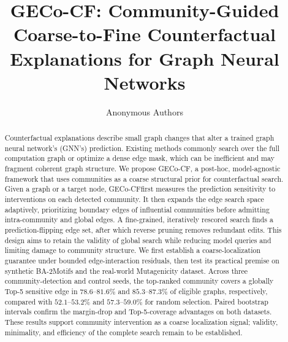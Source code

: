 \documentclass[runningheads]{llncs}
\newcommand{\method}{GECo-CF}
\begin{document}
\title{GECo-CF: Community-Guided Coarse-to-Fine Counterfactual
Explanations for Graph Neural Networks}

\author{Anonymous Authors}

\maketitle

\begin{abstract}
Counterfactual explanations describe small graph changes that alter a trained
graph neural network's (GNN's) prediction. Existing methods commonly
search over the full computation graph or optimize a dense edge mask, which
can be inefficient and may fragment coherent graph structure. We propose
\method, a post-hoc, model-agnostic framework that uses communities as a
coarse structural prior for counterfactual search. Given a graph or a target
node, \method first measures the prediction sensitivity to interventions on
each detected community. It then expands the edge search space adaptively,
prioritizing boundary edges of influential communities before admitting
intra-community and global edges. A fine-grained, iteratively rescored search
finds a prediction-flipping edge set, after which reverse pruning removes
redundant edits. This design aims to retain the validity of global search while
reducing model queries and limiting damage to community structure. We first
establish a coarse-localization guarantee under bounded edge-interaction
residuals, then test its practical premise on synthetic BA-2Motifs and the
real-world Mutagenicity dataset. Across three community-detection and control
seeds, the top-ranked community covers a globally Top-5 sensitive edge in
$78.6$--$81.6\%$ and $85.3$--$87.3\%$ of eligible graphs, respectively,
compared with $52.1$--$53.2\%$ and $57.3$--$59.0\%$ for random selection.
Paired bootstrap intervals confirm the margin-drop and Top-5-coverage
advantages on both datasets. These results support community intervention as
a coarse localization signal; validity, minimality, and efficiency of the
complete search remain to be established.

\end{abstract}
\end{document}
